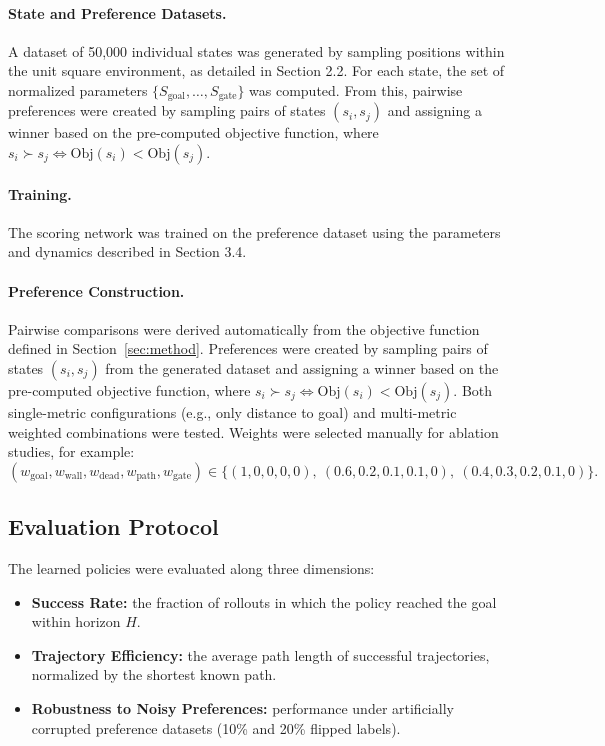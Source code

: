 \documentclass[a4paper,oneside,10pt,ngerman,english]{scrartcl}
\begin{document}
\paragraph{State and Preference Datasets.}
A dataset of 50,000 individual states was generated by sampling positions within the unit square environment, as detailed in Section 2.2. For each state, the set of normalized parameters $\{S_{\text{goal}}, \dots, S_{\text{gate}}\}$ was computed. From this, pairwise preferences were created by sampling pairs of states $(s_i, s_j)$ and assigning a winner based on the pre-computed objective function, where $s_i \succ s_j \iff \mathrm{Obj}(s_i) < \mathrm{Obj}(s_j)$.

\paragraph{Training.}
The scoring network was trained on the preference dataset using the parameters and dynamics described in Section 3.4.

\paragraph{Preference Construction.}
Pairwise comparisons were derived automatically from the objective function defined in Section~\ref{sec:method}. 
Preferences were created by sampling pairs of states $(s_i, s_j)$ from the generated dataset and assigning a winner based on the pre-computed objective function, where $s_i \succ s_j \iff \mathrm{Obj}(s_i) < \mathrm{Obj}(s_j)$.
Both single-metric configurations (e.g., only distance to goal) and multi-metric weighted combinations were tested. 
Weights were selected manually for ablation studies, for example:
$$
(w_{\text{goal}}, w_{\text{wall}}, w_{\text{dead}}, w_{\text{path}}, w_{\text{gate}}) \in 
\{(1,0,0,0,0), \ (0.6,0.2,0.1,0.1,0), \ (0.4,0.3,0.2,0.1,0)\}.
$$

\subsection{Evaluation Protocol}

The learned policies were evaluated along three dimensions:

\begin{itemize}
    \item \textbf{Success Rate:} the fraction of rollouts in which the policy reached the goal within horizon $H$.
    \item \textbf{Trajectory Efficiency:} the average path length of successful trajectories, normalized by the shortest known path.
    \item \textbf{Robustness to Noisy Preferences:} performance under artificially corrupted preference datasets (10\% and 20\% flipped labels).
\end{itemize}
\end{document}
